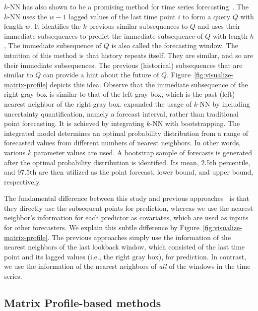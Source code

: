 $k$-NN has also shown to be a promising method for time series forecasting~\cite{tajmouati2024applying, martinez2019methodology, thi2021forecast}.
The $k$-NN uses the $w-1$ lagged values of the last time point $i$ to form a query $Q$ with length $w$.
It identifies the $k$ previous similar subsequences to $Q$ and uses their immediate subsequences to predict the immediate subsequence of $Q$ with length $h$, 
The immediate subsequence of $Q$ is also called the forecasting window.
The intuition of this method is that history repeats itself.
They are similar, and so are their immediate subsequences.
The previous (historical) subsequences that are similar to $Q$ can provide a hint about the future of $Q$. 
%
Figure~\ref{fig:visualize-matrix-profile} depicts this idea. 
Observe that the immediate subsequence of the right gray box is similar to that of the left gray box, which is the past (left) nearest neighbor of the right gray box.
%
\cite{srisuradetchai2024novel} expanded the usage of $k$-NN by including uncertainty quantification, namely a forecast interval, rather than traditional point forecasting.
It is achieved by integrating $k$-NN with bootstrapping.
The integrated model determines an optimal probability distribution from a range of forecasted values from different numbers of nearest neighbors.
In other words, various $k$ parameter values are used.
A bootstrap sample of forecasts is generated after the optimal probability distribution is identified.
Its mean, 2.5th percentile, and 97.5th are then utilized as the point forecast, lower bound, and upper bound, respectively. 

The fundamental difference between this study and previous approaches~\cite{tajmouati2024applying, martinez2019methodology, thi2021forecast} is that they directly use the subsequent points for prediction, whereas we use the nearest neighbor's information for each predictor as covariates, which are used as inputs for other forecasters.
We explain this subtle difference by Figure~\ref{fig:visualize-matrix-profile}.
The previous approaches simply use the information of the nearest neighbors of the last lookback window, which consisted of the last time point and its lagged values (i.e., the right gray box), for prediction.
In contrast, we use the information of the nearest neighbors of \textit{all} of the windows in the time series.

\subsection{Matrix Profile-based methods} %

